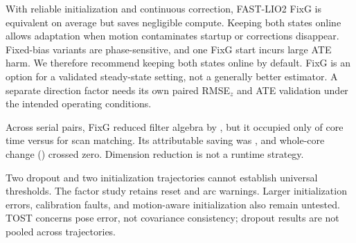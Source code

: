 With reliable initialization and continuous correction, FAST-LIO2 FixG is
equivalent on average but saves negligible compute. Keeping both states online
allows adaptation when motion contaminates startup or corrections disappear.
Fixed-bias variants are phase-sensitive, and one FixG start incurs large ATE
harm. We therefore recommend keeping both states online by default. FixG is an
option for a validated steady-state setting, not a generally better estimator.
A separate direction factor needs its own paired RMSE$_z$ and ATE validation
under the intended operating conditions.

Across \NumRuntimePairs{} serial pairs, FixG reduced filter algebra by
\RuntimeAlgebraReduction{}, but it occupied only \RuntimeAlgebraCoreShare{} of
core time versus \RuntimeMatchingCoreShare{} for scan matching. Its attributable
saving was \RuntimeAttributableCoreSaving{}, and whole-core change
(\RuntimeCoreMedianChangeRange{}) crossed zero. Dimension reduction is not a
runtime strategy.

Two dropout and two initialization trajectories cannot establish universal
thresholds. The factor study retains \NumHallDirResetOutcomes{} reset and
\NumTuhhDirArcWarnings{} arc warnings. Larger initialization errors,
calibration faults, and motion-aware initialization also remain untested.
TOST concerns pose error, not covariance
consistency; dropout results are not pooled across trajectories.

\vfuzz=3pt
\balance
